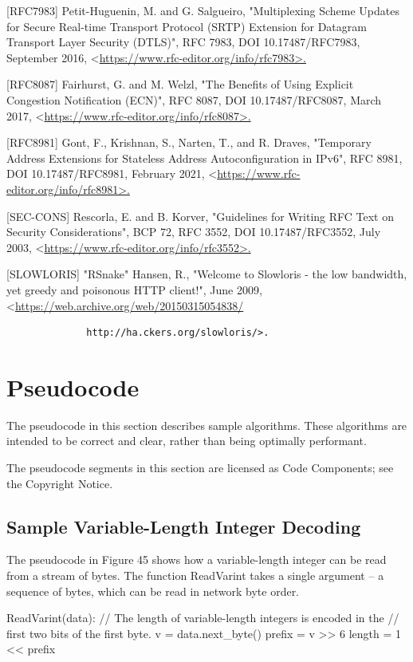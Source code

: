 \documentclass{article}
\begin{document}
[RFC7983]  Petit-Huguenin, M. and G. Salgueiro, "Multiplexing Scheme Updates for Secure Real-time Transport Protocol (SRTP) Extension for Datagram Transport Layer Security (DTLS)", RFC 7983, DOI 10.17487/RFC7983, September 2016, <\url{https://www.rfc-editor.org/info/rfc7983>.}

[RFC8087]  Fairhurst, G. and M. Welzl, "The Benefits of Using Explicit Congestion Notification (ECN)", RFC 8087, DOI 10.17487/RFC8087, March 2017, <\url{https://www.rfc-editor.org/info/rfc8087>.}

[RFC8981]  Gont, F., Krishnan, S., Narten, T., and R. Draves, "Temporary Address Extensions for Stateless Address Autoconfiguration in IPv6", RFC 8981, DOI 10.17487/RFC8981, February 2021, <\url{https://www.rfc-editor.org/info/rfc8981>.}

[SEC-CONS] Rescorla, E. and B. Korver, "Guidelines for Writing RFC Text on Security Considerations", BCP 72, RFC 3552, DOI 10.17487/RFC3552, July 2003, <\url{https://www.rfc-editor.org/info/rfc3552>.}

[SLOWLORIS] "RSnake" Hansen, R., "Welcome to Slowloris - the low bandwidth, yet greedy and poisonous HTTP client!", June 2009, <\url{https://web.archive.org/web/20150315054838/}

\begin{verbatim}
              http://ha.ckers.org/slowloris/>.
\end{verbatim}

\section{Pseudocode}

The pseudocode in this section describes sample algorithms.  These algorithms are intended to be correct and clear, rather than being optimally performant.

The pseudocode segments in this section are licensed as Code Components; see the Copyright Notice.

\subsection{Sample Variable-Length Integer Decoding}

The pseudocode in Figure 45 shows how a variable-length integer can be read from a stream of bytes.  The function ReadVarint takes a single argument -- a sequence of bytes, which can be read in network byte order.

ReadVarint(data): // The length of variable-length integers is encoded in the // first two bits of the first byte. v = data.next\_byte() prefix = v >> 6 length = 1 << prefix
\end{document}
